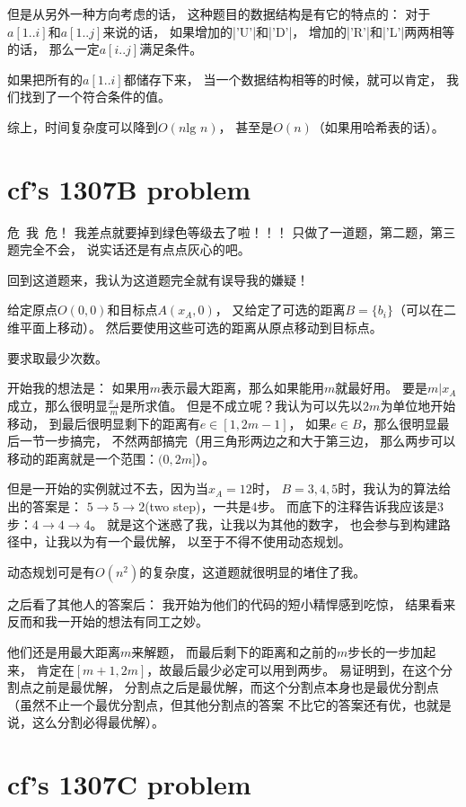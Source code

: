 但是从另外一种方向考虑的话，
这种题目的数据结构是有它的特点的：
对于$a[1..i]$和$a[1..j]$来说的话，
如果增加的\vb|'U'|和\vb|'D'|，
增加的\vb|'R'|和\vb|'L'|两两相等的话，
那么一定$a[i..j]$满足条件。

如果把所有的$a[1..i]$都储存下来，
当一个数据结构相等的时候，就可以肯定，
我们找到了一个符合条件的值。

综上，时间复杂度可以降到$O(n \text{lg }n)$，
甚至是$O(n)$（如果用哈希表的话）。


\section{cf's 1307B problem}

危\ 我\ 危！
我差点就要掉到绿色等级去了啦！！！
只做了一道题，第二题，第三题完全不会，
说实话还是有点点灰心的吧。

回到这道题来，我认为这道题完全就有误导我的嫌疑！

给定原点$O(0,0)$和目标点$A(x_A,0)$，
又给定了可选的距离$B=\{b_i\}$（可以在二维平面上移动）。
然后要使用这些可选的距离从原点移动到目标点。

要求取最少次数。

开始我的想法是：
如果用$m$表示最大距离，那么如果能用$m$就最好用。
要是$m|x_A$成立，那么很明显$\frac{x_A}{m}$是所求值。
但是不成立呢？我认为可以先以$2m$为单位地开始移动，
到最后很明显剩下的距离有$e\in [1, 2m-1]$，
如果$e\in B$，那么很明显最后一节一步搞完，
不然两部搞完（用三角形两边之和大于第三边，
那么两步可以移动的距离就是一个范围：$(0, 2m]$）。

但是一开始的实例就过不去，因为当$x_A=12$时，
$B={3, 4, 5}$时，我认为的算法给出的答案是：
$5\to 5\to 2$(two step)，一共是4步。
而底下的注释告诉我应该是3步：$4\to 4\to 4$。
就是这个迷惑了我，让我以为其他的数字，
也会参与到构建路径中，让我以为有一个最优解，
以至于不得不使用动态规划。

动态规划可是有$O(n^2)$的复杂度，这道题就很明显的堵住了我。

之后看了其他人的答案后：
我开始为他们的代码的短小精悍感到吃惊，
结果看来反而和我一开始的想法有同工之妙。

他们还是用最大距离$m$来解题，
而最后剩下的距离和之前的$m$步长的一步加起来，
肯定在$[m+1, 2m]$，故最后最少必定可以用到两步。
易证明到，在这个分割点之前是最优解，
分割点之后是最优解，而这个分割点本身也是最优分割点
（虽然不止一个最优分割点，但其他分割点的答案
不比它的答案还有优，也就是说，这么分割必得最优解）。


\section{cf's 1307C problem}

